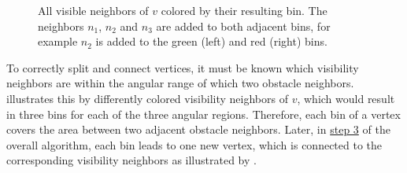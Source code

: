 			\begin{figure}[h]
				\begin{figcenter}
				\end{figcenter}
				\caption{
					All visible neighbors of $v$ colored by their resulting bin.
					The neighbors $n_1$, $n_2$ and $n_3$ are added to both adjacent bins, for example $n_2$ is added to the green (left) and red (right) bins.
				}
				\label{fig:visibility-bin-sorting}
			\end{figure}
			
			To correctly split and connect vertices, it must be known which visibility neighbors are within the angular range of which two obstacle neighbors.
			 illustrates this by differently colored visibility neighbors of $v$, which would result in three bins for each of the three angular regions.
			Therefore, each bin of a vertex covers the area between two adjacent obstacle neighbors.
			Later, in \hyperref[subsec:step-3-graph-creation]{step 3} of the overall algorithm, each bin leads to one new vertex, which is connected to the corresponding visibility neighbors as illustrated by .
			
